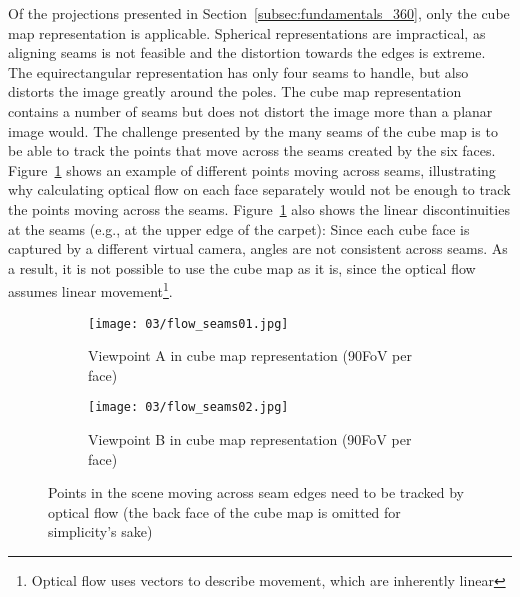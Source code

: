 
Of the projections presented in Section~\ref{subsec:fundamentals_360}, only the cube map representation is applicable. Spherical representations are impractical, as aligning seams is not feasible and the distortion towards the edges is extreme. The equirectangular representation has only four seams to handle, but also distorts the image greatly around the poles. The cube map representation contains a number of seams but does not distort the image more than a planar image would. 
The challenge presented by the many seams of the cube map is to be able to track the points that move across the seams created by the six faces. Figure~\ref{fig:flow_seams} shows an example of different points moving across seams, illustrating why calculating optical flow on each face separately would not be enough to track the points moving across the seams. Figure~\ref{fig:flow_seams} also shows the linear discontinuities at the seams (e.g., at the upper edge of the carpet): Since each cube face is captured by a different virtual camera, angles are not consistent across seams. As a result, it is not possible to use the cube map as it is, since the optical flow assumes linear movement\footnote{Optical flow uses vectors to describe movement, which are inherently linear}.

\begin{figure}[ph]
\centering
    \hfill
    \begin{subfigure}[t]{0.45\textwidth}            
            \centering
            \texttt{[image: 03/flow\_seams01.jpg]}
            \caption{Viewpoint A in cube map representation (90\degree FoV per face)}
    \end{subfigure}%
    \hfill
    \begin{subfigure}[t]{0.45\textwidth}
            \centering
            \texttt{[image: 03/flow\_seams02.jpg]}
            \caption{Viewpoint B in cube map representation (90\degree FoV per face)}
    \end{subfigure}
    \hfill
    \hfill
  \caption[Points traversing seams in the cube map]{Points in the scene moving across seam edges need to be tracked by optical flow (the back face of the cube map is omitted for simplicity's sake)} \label{fig:flow_seams}
\end{figure}


